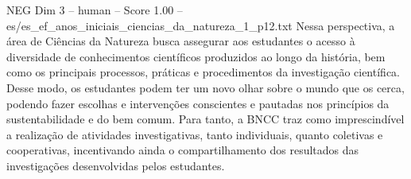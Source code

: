 \begin{textsample}{NEG Dim 3 – human – Score 1.00 – es/es\_ef\_anos\_iniciais\_ciencias\_da\_natureza\_1\_p12.txt}  \label{ex:f3_neg_020}
Nessa perspectiva, a área de Ciências da Natureza busca assegurar aos estudantes o acesso à diversidade de conhecimentos científicos produzidos ao longo da história, bem como os principais processos, práticas e procedimentos da investigação científica.
Desse modo, os estudantes podem ter um novo olhar sobre o mundo que os cerca, podendo fazer escolhas e intervenções conscientes e pautadas nos princípios da sustentabilidade e do bem comum.
Para tanto, a BNCC traz como imprescindível a realização de atividades investigativas, tanto individuais, quanto coletivas e cooperativas, incentivando ainda o compartilhamento dos resultados das investigações desenvolvidas pelos estudantes.

\end{textsample}
